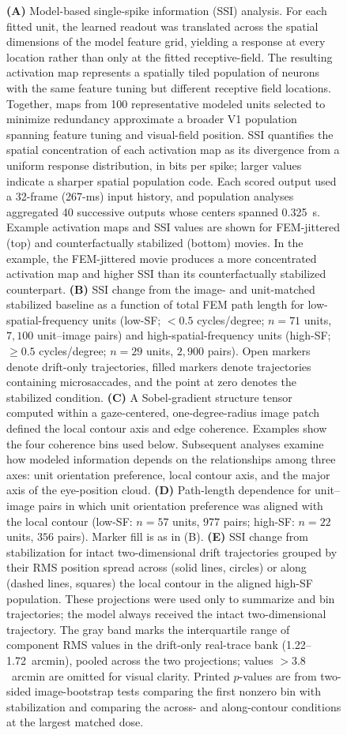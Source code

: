 \documentclass{lite}
\begin{document}
\begin{figure}[p]
  \ContinuedFloat
  \captionsetup{font=footnotesize,singlelinecheck=false}
  \caption{
    \textbf{(A)} Model-based single-spike information (SSI) analysis. For each fitted unit, the learned readout was translated across the spatial dimensions of the model feature grid, yielding a response at every location rather than only at the fitted receptive-field. The resulting activation map represents a spatially tiled population of neurons with the same feature tuning but different receptive field locations. Together, maps from 100 representative modeled units selected to minimize redundancy approximate a broader V1 population spanning feature tuning and visual-field position. SSI quantifies the spatial concentration of each activation map as its divergence from a uniform response distribution, in bits per spike; larger values indicate a sharper spatial population code. Each scored output used a 32-frame (267-ms) input history, and population analyses aggregated 40 successive outputs whose centers spanned 0.325~s. Example activation maps and SSI values are shown for FEM-jittered (top) and counterfactually stabilized (bottom) movies. In the example, the FEM-jittered movie produces a more concentrated activation map and higher SSI than its counterfactually stabilized counterpart.
    \textbf{(B)} SSI change from the image- and unit-matched stabilized baseline as a function of total FEM path length for low-spatial-frequency units (low-SF; $<0.5$ cycles/degree; $n=71$ units, $7{,}100$ unit--image pairs) and high-spatial-frequency units (high-SF; $\geq0.5$ cycles/degree; $n=29$ units, $2{,}900$ pairs). Open markers denote drift-only trajectories, filled markers denote trajectories containing microsaccades, and the point at zero denotes the stabilized condition.
    \textbf{(C)} A Sobel-gradient structure tensor computed within a gaze-centered, one-degree-radius image patch defined the local contour axis and edge coherence. Examples show the four coherence bins used below. Subsequent analyses examine how modeled information depends on the relationships among three axes: unit orientation preference, local contour axis, and the major axis of the eye-position cloud.
    \textbf{(D)} Path-length dependence for unit--image pairs in which unit orientation preference was aligned with the local contour (low-SF: $n=57$ units, $977$ pairs; high-SF: $n=22$ units, $356$ pairs). Marker fill is as in (B).
    \textbf{(E)} SSI change from stabilization for intact two-dimensional drift trajectories grouped by their RMS position spread across (solid lines, circles) or along (dashed lines, squares) the local contour in the aligned high-SF population. These projections were used only to summarize and bin trajectories; the model always received the intact two-dimensional trajectory. The gray band marks the interquartile range of component RMS values in the drift-only real-trace bank (1.22--1.72~arcmin), pooled across the two projections; values $>3.8$~arcmin are omitted for visual clarity. Printed $p$-values are from two-sided image-bootstrap tests comparing the first nonzero bin with stabilization and comparing the across- and along-contour conditions at the largest matched dose.
}
\end{figure}
\end{document}
